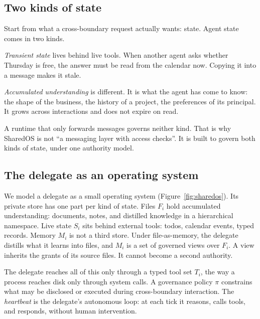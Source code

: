 \documentclass[10pt,a4paper]{article}
\begin{document}
\subsection{Two kinds of state}
\label{sec:twokinds}

Start from what a cross-boundary request actually wants: state. Agent state comes in two kinds.

\emph{Transient state} lives behind live tools. When another agent asks whether Thursday is free, the answer must be read from the calendar now. Copying it into a message makes it stale.

\emph{Accumulated understanding} is different. It is what the agent has come to know: the shape of the business, the history of a project, the preferences of its principal. It grows across interactions and does not expire on read.

A runtime that only forwards messages governs neither kind. That is why SharedOS is not ``a messaging layer with access checks''. It is built to govern both kinds of state, under one authority model.

\subsection{The delegate as an operating system}

We model a delegate as a small operating system (Figure~\ref{fig:sharedos}). Its private store has one part per kind of state. Files $F_i$ hold accumulated understanding: documents, notes, and distilled knowledge in a hierarchical namespace. Live state $S_i$ sits behind external tools: todos, calendar events, typed records. Memory $M_i$ is not a third store. Under file-as-memory, the delegate distills what it learns into files, and $M_i$ is a set of governed views over $F_i$. A view inherits the grants of its source files. It cannot become a second authority.

The delegate reaches all of this only through a typed tool set $T_i$, the way a process reaches disk only through system calls. A governance policy $\pi$ constrains what may be disclosed or executed during cross-boundary interaction. The \emph{heartbeat} is the delegate's autonomous loop: at each tick it reasons, calls tools, and responds, without human intervention.
\end{document}
